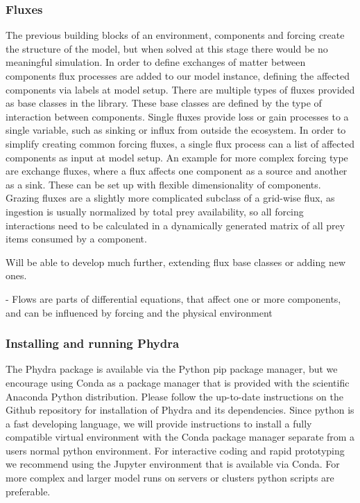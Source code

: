 \documentclass[template.tex]{subfiles}
\begin{document}
\subsubsection{Fluxes}
The previous building blocks of an environment, components and forcing create the structure of the model, but when solved at this stage there would be no meaningful simulation. In order to define exchanges of matter between components flux processes are added to our model instance, defining the affected components via labels at model setup.
There are multiple types of fluxes provided as base classes in the library. These base classes are defined by the type of interaction between components. Single fluxes provide loss or gain processes to a single variable, such as sinking or influx from outside the ecosystem. In order to simplify creating common forcing fluxes, a single flux process can a list of affected components as input at model setup. An example for more complex forcing type are exchange fluxes, where a flux affects one component as a source and another as a sink. These can be set up with flexible dimensionality of components. Grazing fluxes are a slightly more complicated subclass of a grid-wise flux, as ingestion is usually normalized by total prey availability, so all forcing interactions need to be calculated in a dynamically generated matrix of all prey items consumed by a component.

Will be able to develop much further, extending flux base classes or adding new ones.


- Flows are parts of differential equations, that affect one or more components, and can be influenced by forcing and the physical environment


\subsubsection{Installing and running Phydra}
The Phydra package is available via the Python pip package manager, but we encourage using Conda as a package manager that is provided with the scientific Anaconda Python distribution.
Please follow the up-to-date instructions on the Github repository for installation of Phydra and its dependencies.
Since python is a fast developing language, we will provide instructions to install a fully compatible virtual environment with the Conda package manager separate from a users normal python environment. For interactive coding and rapid prototyping we recommend using the Jupyter environment that is available via Conda. For more complex and larger model runs on servers or clusters python scripts are preferable.
\end{document}
